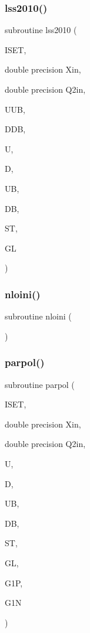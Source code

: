 \mbox{\label{polpdf_8f_a931f3251bea4fe7a36354658de6802ef}} 
\subsubsection{\texorpdfstring{lss2010()}{lss2010()}}
{\footnotesize\ttfamily subroutine lss2010 (\begin{DoxyParamCaption}\item[{}]{I\+S\+ET,  }\item[{double precision}]{Xin,  }\item[{double precision}]{Q2in,  }\item[{}]{U\+UB,  }\item[{}]{D\+DB,  }\item[{}]{U,  }\item[{}]{D,  }\item[{}]{UB,  }\item[{}]{DB,  }\item[{}]{ST,  }\item[{}]{GL }\end{DoxyParamCaption})}

\mbox{\label{polpdf_8f_a0cb6a9f9f33545f3057d9b115f5d055c}} 
\subsubsection{\texorpdfstring{nloini()}{nloini()}}
{\footnotesize\ttfamily subroutine nloini (\begin{DoxyParamCaption}{ }\end{DoxyParamCaption})}

\mbox{\label{polpdf_8f_a8974471cdf7a32a43361f0ed8aada457}} 
\subsubsection{\texorpdfstring{parpol()}{parpol()}}
{\footnotesize\ttfamily subroutine parpol (\begin{DoxyParamCaption}\item[{}]{I\+S\+ET,  }\item[{double precision}]{Xin,  }\item[{double precision}]{Q2in,  }\item[{}]{U,  }\item[{}]{D,  }\item[{}]{UB,  }\item[{}]{DB,  }\item[{}]{ST,  }\item[{}]{GL,  }\item[{}]{G1P,  }\item[{}]{G1N }\end{DoxyParamCaption})}

